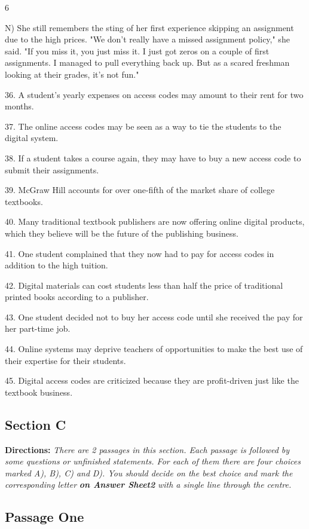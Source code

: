 \documentclass[UTF8,11pt]{ctexart}
\begin{document}
6


N) She still remembers the sting of her first experience skipping an assignment due to the high prices. "We don't really have a missed assignment policy," she said. "If you miss it, you just miss it. I just got zeros on a couple of first assignments. I managed to pull everything back up. But as a scared freshman looking at their grades, it's not fun."


36. A student's yearly expenses on access codes may amount to their rent for two months.


37. The online access codes may be seen as a way to tie the students to the digital system.


38. If a student takes a course again, they may have to buy a new access code to submit their assignments.


39. McGraw Hill accounts for over one-fifth of the market share of college textbooks.


40. Many traditional textbook publishers are now offering online digital products, which they believe will be the future of the publishing business.


41. One student complained that they now had to pay for access codes in addition to the high tuition.


42. Digital materials can cost students less than half the price of traditional printed books according to a publisher.


43. One student decided not to buy her access code until she received the pay for her part-time job.


44. Online systems may deprive teachers of opportunities to make the best use of their expertise for their students.


45. Digital access codes are criticized because they are profit-driven just like the textbook business.


\subsection*{\textbf{Section C}}


\textbf{Directions:}\textit{ There are 2 passages in this section. Each passage is followed by some questions} \textit{or unfinished statements. For each of them there are four choices marked A), B), C) and}\textit{ D)}\textit{. You should decide on the best choice and mark the corresponding letter}\textbf{\textit{ on Answer Sheet2}} \textit{with a single line through the centre.}


\subsection*{\textbf{Passage One}}
\end{document}

